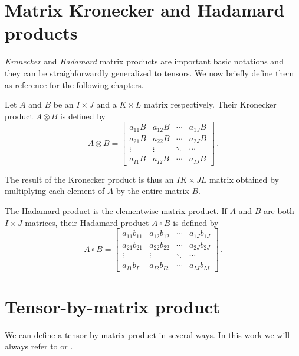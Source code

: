 \section{Matrix Kronecker and Hadamard products}
\emph{Kronecker} and \emph{Hadamard} matrix products are important basic notations and they can be straighforwardly generalized to tensors. We now briefly define them as reference for the following chapters.
\begin{Def}
  Let $A$ and $B$ be an $I \times J$ and a $K \times L$ matrix respectively. Their Kronecker product $A \otimes B$ is defined by
  \begin{equation} \label{def:kronecker}
    A \otimes B =
    \begin{bmatrix}
      a_{11}B & a_{12}B & \cdots & a_{1J}B \\
      a_{21}B & a_{22}B & \cdots & a_{2J}B \\
      \vdots & \vdots & \ddots & \cdots \\
      a_{I1}B & a_{I2}B & \cdots & a_{IJ}B
    \end{bmatrix}\, .
  \end{equation}
\end{Def}
The result of the Kronecker product is thus an $IK \times JL$ matrix obtained by multiplying each element of $A$ by the entire matrix $B$.

\begin{Def}
  The Hadamard product is the elementwise matrix product. If $A$ and $B$ are both $I \times J$ matrices, their Hadamard product $A \circ B$ is defined by
  \begin{equation} \label{def:hadamard}
    A \circ B =
    \begin{bmatrix}
      a_{11}b_{11} & a_{12}b_{12} & \cdots & a_{1J}b_{1J} \\
      a_{21}b_{21} & a_{22}b_{22} & \cdots & a_{2J}b_{2J} \\
      \vdots & \vdots & \ddots & \cdots \\
      a_{I1}b_{I1} & a_{I2}b_{I2} & \cdots & a_{IJ}b_{IJ}
    \end{bmatrix}\, .
  \end{equation}
\end{Def}

\section{Tensor-by-matrix product}
We can define a tensor-by-matrix product in several ways. In this work we will always refer to  or .

